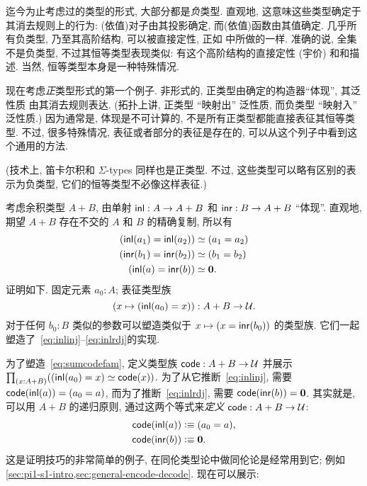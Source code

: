 %
%
迄今为止考虑过的类型的形式, 大部分都是\emph{负}类型.
%
%
直观地, 这意味这些类型确定于其消去规则上的行为: (依值)对子由其投影确定, 而(依值)函数由其值确定.
几乎所有负类型, 乃至其高阶结构, 可以被直接定性, 正如 中所做的一样.
准确的说, 全集不是负类型, 不过其恒等类型表现类似: 有这个高阶结构的直接定性 (宇价) 和和描述.
当然, 恒等类型本身是一种特殊情况.

现在考虑\emph{正}类型形式的第一个例子.
%
非形式的, 正类型由确定的构造器``体现'', 其泛性质 由其消去规则表达.
(拓扑上讲, 正类型 ``映射出'' 泛性质, 而负类型 ``映射入'' 泛性质.)
因为通常是, 体现是不可计算的, 不是所有正类型都能直接表征其恒等类型.
不过, 很多特殊情况, 表征或者部分的表征是存在的, 可以从这个列子中看到这个通用的方法.

(技术上, 笛卡尔积和 $\Sigma$-types 同样也是正类型.
不过, 这些类型可以略有区别的表示为负类型, 它们的恒等类型不必像这样表征.)

考虑余积类型 $A+B$, 由单射 ${\mathsf{inl}}:A\to A+B$ 和 ${\mathsf{inr}}:B\to A+B$ ``体现''.
直观地, 期望 $A+B$ 存在不交的 $A$ 和 $B$ 的精确复制, 所以有
\begin{align}
{(\inl(a_1)=\inl(a_2))}
    &\eqvsym {(a_1=a_2)} \label{eq:inlinj}\\
    {(\inr(b_1)=\inr(b_2))}&\eqvsym {(b_1=b_2)}\\
    {(\inl(a)= \inr(b))} &\eqvsym {\emptyt}. \label{eq:inlrdj}
\end{align}
证明如下.
固定元素 $a_0:A$; 表征类型族
\begin{equation}
(x\mapsto (\inl(a_0)=x))
    : A+B \to \type.\label{eq:sumcodefam}
\end{equation}
对于任何 $b_0:B$ 类似的参数可以塑造类似于 $x\mapsto (x = {\mathsf{inr}}(b_0))$ 的类型族.
它们一起塑造了~\eqref{eq:inlinj}--\eqref{eq:inlrdj}的实现.

为了塑造~\eqref{eq:sumcodefam}, 定义类型族 $\mathsf{code}:A+B\to\mathcal{U}$ 并展示 $\prd{x:A+B} (\eqv{(\inl(a_0)=x)}{\code(x)})$.
为了从它推断~\eqref{eq:inlinj}, 需要 $\mathsf{code}({\mathsf{inl}}(a)) = (a_0=a)$, 而为了推断~\eqref{eq:inlrdj}, 需要 $\mathsf{code} ({\mathsf{inr}}(b)) = \mathbf{0}$.
其实就是, 可以用 $A+B$ 的递归原则, 通过这两个等式来\emph{定义} $\mathsf{code}:A+B\to\mathcal{U}$:
\begin{align*}
    \mathsf{code}({\mathsf{inl}}(a)) &\vcentcolon\equiv (a_0=a),\\
    \mathsf{code}({\mathsf{inr}}(b)) &\vcentcolon\equiv \mathbf{0}.
\end{align*}
这是证明技巧的非常简单的例子, 在同伦类型论中做同伦论是经常用到它;
例如 \cref{sec:pi1-s1-intro,sec:general-encode-decode}.
%
现在可以展示:

